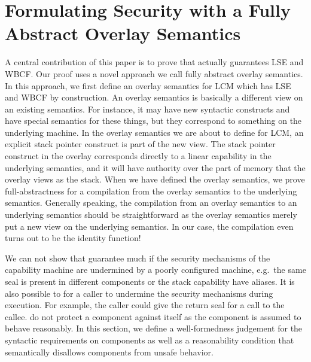 \documentclass[acmsmall,review,anonymous]{acmart}\settopmatter{printfolios=true,printccs=false,printacmref=false}
\newcommand{\trgcm}{\textsc{LCM}}
\begin{document}
\section{Formulating Security with a Fully Abstract Overlay Semantics}
\label{sec:form-secur-with}
A central contribution of this paper is to prove that \stktokens{} actually guarantees LSE and WBCF.
Our proof uses a novel approach we call fully abstract overlay semantics.
In this approach, we first define an overlay semantics for \trgcm{} which has LSE and WBCF by construction.
An overlay semantics is basically a different view on an existing semantics.
For instance, it may have new syntactic constructs and have special semantics for these things, but they correspond to something on the underlying machine.
In the overlay semantics we are about to define for \trgcm{}, an explicit stack pointer construct is part of the new view.
The stack pointer construct in the overlay corresponds directly to a linear capability in the underlying semantics, and it will have authority over the part of memory that the overlay views as the stack.
When we have defined the overlay semantics, we prove full-abstractness for a compilation from the overlay semantics to the underlying semantics.
Generally speaking, the compilation from an overlay semantics to an underlying semantics should be straightforward as the overlay semantics merely put a new view on the underlying semantics.
In our case, the compilation even turns out to be the identity function!

We can not show that \stktokens{} guarantee much if the security mechanisms of the capability machine are undermined by a poorly configured machine, e.g.\ the same seal is present in different components or the stack capability have aliases.
It is also possible to for a caller to undermine the security mechanisms during execution.
For example, the caller could give the return seal for a call to the callee.
\stktokens{} do not protect a component against itself as the component is assumed to behave reasonably.
In this section, we define a well-formedness judgement for the syntactic requirements on components as well as a reasonability condition that semantically disallows components from unsafe behavior.
\end{document}
